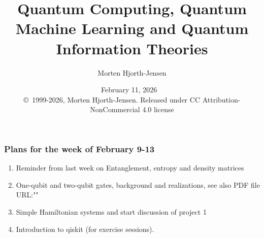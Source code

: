 \documentclass{beamer}
\begin{document}

\newcommand{\exercisesection}[1]{\subsection*{#1}}







\title{Quantum Computing, Quantum Machine Learning and Quantum Information Theories}


\author{Morten Hjorth-Jensen}

\date{February 11, 2026
\ \\ 
{\tiny \copyright\ 1999-2026, Morten Hjorth-Jensen. Released under CC Attribution-NonCommercial 4.0 license}
}

\begin{frame}
\titlepage
\end{frame}

\begin{frame}
\frametitle{Plans for the week of February 9-13}

\begin{enumerate}
\item Reminder from last week on Entanglement, entropy and density matrices

\item One-qubit and two-qubit gates, background and realizations, see also PDF file URL:""

\item Simple Hamiltonian systems and start discussion of project 1

\item Introduction to qiskit (for exercise sessions).
\end{enumerate}

\noindent
\end{frame}
\end{document}
